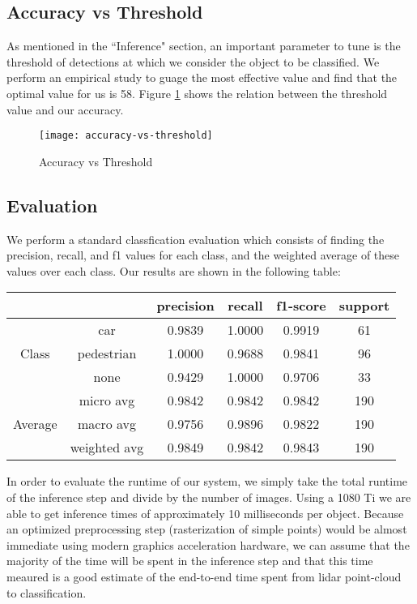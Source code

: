 \documentclass[runningheads,a4paper]{llncs}
\begin{document}
\subsection{Accuracy vs Threshold}
As mentioned in the ``Inference" section, an important parameter to tune is the threshold
of detections at which we consider the object to be classified. We perform an empirical
study to guage the most effective value and find that the optimal value for us is 58.
Figure \ref{fig:accuracy-vs-threshold} shows the relation between the threshold value
and our accuracy.


\begin{figure}[h]
  \caption{Accuracy vs Threshold}
  \centering
  \texttt{[image: accuracy-vs-threshold]}
  \label{fig:accuracy-vs-threshold}
\end{figure}


\subsection{Evaluation}
We perform a standard classfication evaluation which consists of finding the precision,
recall, and f1 values for each class, and the weighted average of these values over each
class. Our results are shown in the following table: 

\begin{center}
\begin{tabular}{ |c|c|c|c|c|c| } 
\hline
	    & & precision & recall & f1-score & support \\
\hline
\multirow{3}{4em}{Class} & car & 0.9839 & 1.0000 & 0.9919 & 61  \\
  		  & pedestrian & 1.0000 & 0.9688 & 0.9841 & 96  \\
      		      & none & 0.9429 & 1.0000 & 0.9706 & 33  \\
\hline
\multirow{3}{4em}{Average}  & micro avg & 0.9842 & 0.9842 & 0.9842 & 190 \\
   			    & macro avg & 0.9756 & 0.9896 & 0.9822 & 190 \\
			 & weighted avg & 0.9849 & 0.9842 & 0.9843 & 190 \\

 \hline
\end{tabular}
\end{center}

In order to evaluate the runtime of our system, we simply take the total runtime of the inference
step and divide by the number of images. Using a 1080 Ti we are able to get 
inference times of approximately 10 milliseconds per object. Because an 
optimized preprocessing step (rasterization of simple points) would be 
almost immediate using modern graphics acceleration hardware, we can assume 
that the majority of the time will be spent in the inference step and that 
this time meaured is a good estimate of the end-to-end time spent from lidar 
point-cloud to classification.
\end{document}
